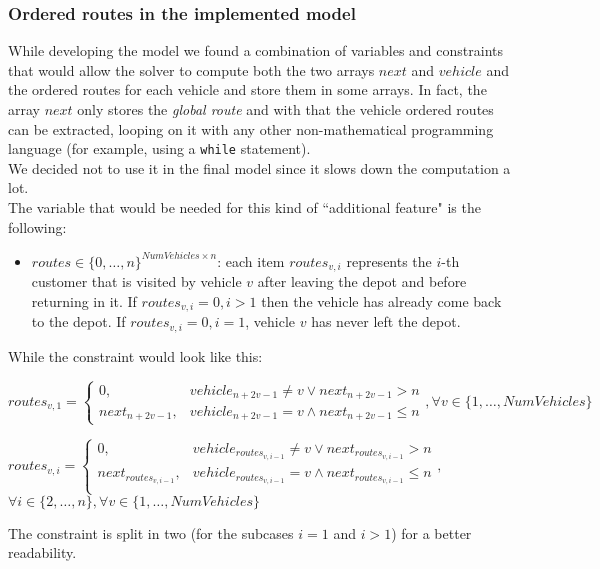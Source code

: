 \documentclass[../main.tex]{subfiles}
\begin{document}
\subsubsection{Ordered routes in the implemented model}
\label{subsubsec:ordered-routes-implemented-model}
While developing the model we found a combination of variables and constraints that would allow the solver to compute both the two arrays $next$ and $vehicle$ and the ordered routes for each vehicle and store them in some arrays.
In fact, the array $next$ only stores the \textit{global route} and with that the vehicle ordered routes can be extracted, looping on it with any other non-mathematical programming language (for example, using a \texttt{while} statement).\\
We decided not to use it in the final model since it slows down the computation a lot.\\
The variable that would be needed for this kind of ``additional feature" is the following:
\begin{itemize}
    \item $routes \in \{0,\dots,n\}^{NumVehicles\times{}n}$: each item $routes_{v,i}$ represents the $i$-th customer that is visited by vehicle $v$ after leaving the depot and before returning in it. If $routes_{v,i} = 0, i>1$ then the vehicle has already come back to the depot. If $routes_{v,i} = 0, i=1$, vehicle $v$ has never left the depot.
\end{itemize}
While the constraint would look like this:
\begin{center}
    \begin{math}
        routes_{v,1} =
        \begin{cases}
            0, & vehicle_{n+2v-1} \neq v \vee next_{n+2v-1} > n \\
            next_{n+2v-1}, & vehicle_{n+2v-1} = v \wedge next_{n+2v-1} \leq n
        \end{cases},
        \forall v \in \{1,\dots,NumVehicles\}
    \end{math}
\end{center}
\begin{center}
    \begin{math}
        routes_{v,i} =
        \begin{cases}
            0, & vehicle_{routes_{v,i-1}} \neq v \vee next_{routes_{v,i-1}} > n\\
            next_{routes_{v,i-1}}, & vehicle_{routes_{v,i-1}} = v \wedge next_{routes_{v,i-1}} \leq n \\
        \end{cases},
    \end{math}\\
    \begin{math}
        \forall i \in \{2,\dots,n\},
        \forall v \in \{1,\dots,NumVehicles\}
    \end{math}
\end{center}
The constraint is split in two (for the subcases $i=1$ and $i>1$) for a better readability.
\end{document}
